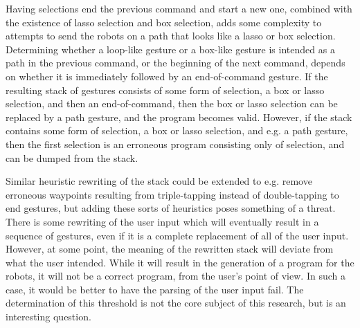 Having selections end the previous command and start a new one, combined with the existence of lasso selection and box selection, adds some complexity to attempts to send the robots on a path that looks like a lasso or box selection. 
Determining whether a loop-like gesture or a box-like gesture is intended as a path in the previous command, or the beginning of the next command, depends on whether it is immediately followed by an end-of-command gesture. 
If the resulting stack of gestures consists of some form of selection, a box or lasso selection, and then an end-of-command, then the box or lasso selection can be replaced by a path gesture, and the program becomes valid. 
However, if the stack contains some form of selection, a box or lasso selection, and e.g. a path gesture, then the first selection is an erroneous program consisting only of selection, and can be dumped from the stack. 

Similar heuristic rewriting of the stack could be extended to e.g. remove erroneous waypoints resulting from triple-tapping instead of double-tapping to end gestures, but adding these sorts of heuristics poses something of a threat. 
There is some rewriting of the user input which will eventually result in a sequence of gestures, even if it is a complete replacement of all of the user input. 
However, at some point, the meaning of the rewritten stack will deviate from what the user intended. 
While it will result in the generation of a program for the robots, it will not be a correct program, from the user's point of view. 
In such a case, it would be better to have the parsing of the user input fail. 
The determination of this threshold is not the core subject of this research, but is an interesting question. 

